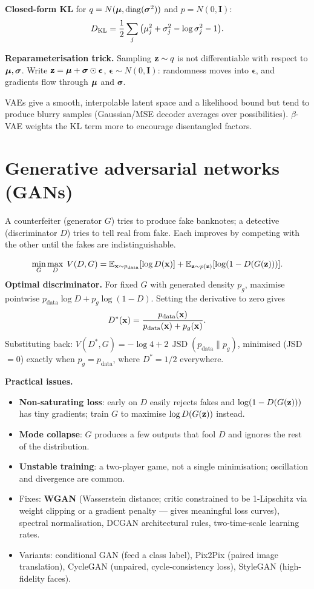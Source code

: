 \textbf{Closed-form KL} for $q=N(\bm{\mu},\operatorname{diag}(\bm\sigma^2))$ and $p=N(0,\mathbf{I})$:
\[D_{\mathrm{KL}}=\frac12\sum_j\big(\mu_j^2+\sigma_j^2-\log\sigma_j^2-1\big).\]

\textbf{Reparameterisation trick.} Sampling $\mathbf{z}\sim q$ is not differentiable with respect to $\bm{\mu},\bm\sigma$. Write $\mathbf{z}=\bm{\mu}+\bm\sigma\odot\bm\epsilon$, $\bm\epsilon\sim N(0,\mathbf{I})$: randomness moves into $\bm\epsilon$, and gradients flow through $\bm{\mu}$ and $\bm\sigma$.

VAEs give a smooth, interpolable latent space and a likelihood bound but tend to produce blurry samples (Gaussian/MSE decoder averages over possibilities). $\beta$-VAE weights the KL term more to encourage disentangled factors.

\section{Generative adversarial networks (GANs)}
\begin{intuition}
A counterfeiter (generator $G$) tries to produce fake banknotes; a detective (discriminator $D$) tries to tell real from fake. Each improves by competing with the other until the fakes are indistinguishable.
\end{intuition}
\[\min_G\max_D\;V(D,G)=\mathbb{E}_{\mathbf{x}\sim p_{\text{data}}}[\log D(\mathbf{x})]+\mathbb{E}_{\mathbf{z}\sim p(\mathbf{z})}[\log(1-D(G(\mathbf{z})))].\]
\textbf{Optimal discriminator.} For fixed $G$ with generated density $p_g$, maximise pointwise $p_{\text{data}}\log D+p_g\log(1-D)$. Setting the derivative to zero gives
\[D^*(\mathbf{x})=\frac{p_{\text{data}}(\mathbf{x})}{p_{\text{data}}(\mathbf{x})+p_g(\mathbf{x})}.\]
Substituting back: $V(D^*,G)=-\log4+2\,\operatorname{JSD}(p_{\text{data}}\|p_g)$, minimised (JSD $=0$) exactly when $p_g=p_{\text{data}}$, where $D^*=1/2$ everywhere.

\textbf{Practical issues.}
\begin{itemize}
  \item \textbf{Non-saturating loss}: early on $D$ easily rejects fakes and $\log(1-D(G(\mathbf{z})))$ has tiny gradients; train $G$ to maximise $\log D(G(\mathbf{z}))$ instead.
  \item \textbf{Mode collapse}: $G$ produces a few outputs that fool $D$ and ignores the rest of the distribution.
  \item \textbf{Unstable training}: a two-player game, not a single minimisation; oscillation and divergence are common.
  \item Fixes: \textbf{WGAN} (Wasserstein distance; critic constrained to be 1-Lipschitz via weight clipping or a gradient penalty --- gives meaningful loss curves), spectral normalisation, DCGAN architectural rules, two-time-scale learning rates.
  \item Variants: conditional GAN (feed a class label), Pix2Pix (paired image translation), CycleGAN (unpaired, cycle-consistency loss), StyleGAN (high-fidelity faces).
\end{itemize}


